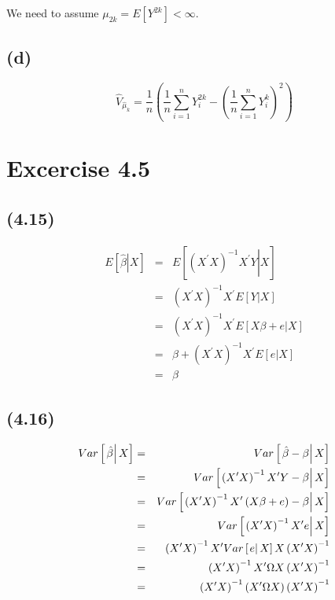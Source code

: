 \documentclass{article}
\begin{document}
We need to assume $\mu _{2k}=E\left[ Y^{2k}\right] <\infty .$

\subsection*{(d)}

\begin{equation*}
\hat{V}_{\hat{\mu}_{k}}=\frac{1}{n}\left( \frac{1}{n}%
\sum_{i=1}^{n}Y_{i}^{2k}-\left( \frac{1}{n}\sum_{i=1}^{n}Y_{i}^{k}\right)
^{2}\right)
\end{equation*}

\section*{Excercise 4.5}

\subsection*{(4.15)}

\begin{eqnarray*}
E\left[ \left. \hat{\beta}\right\vert X\right] &=&E\left[ \left. \left(
X^{\prime }X\right) ^{-1}X^{\prime }Y\right\vert X\right] \\
&=&\left( X^{\prime }X\right) ^{-1}X^{\prime }E\left[ \left. Y\right\vert X%
\right] \\
&=&\left( X^{\prime }X\right) ^{-1}X^{\prime }E\left[ \left. X\beta
+e\right\vert X\right] \\
&=&\beta +\left( X^{\prime }X\right) ^{-1}X^{\prime }E\left[ \left.
e\right\vert X\right] \\
&=&\beta
\end{eqnarray*}

\subsection*{(4.16)}

\begin{eqnarray*}
Var\left[ \left. \hat{\beta}\right\vert X\right] &=&Var\left[ \left. \hat{%
\beta}-\beta \right\vert X\right] \\
&=&Var\left[ \left. \left( X^{\prime }X\right) ^{-1}X^{\prime }Y-\beta
\right\vert X\right] \\
&=&Var\left[ \left. \left( X^{\prime }X\right) ^{-1}X^{\prime }\left( X\beta
+e\right) -\beta \right\vert X\right] \\
&=&Var\left[ \left. \left( X^{\prime }X\right) ^{-1}X^{\prime }e\right\vert X%
\right] \\
&=&\left( X^{\prime }X\right) ^{-1}X^{\prime }Var\left[ \left. e\right\vert X%
\right] X\left( X^{\prime }X\right) ^{-1} \\
&=&\left( X^{\prime }X\right) ^{-1}X^{\prime }\Omega X\left( X^{\prime
}X\right) ^{-1} \\
&=&\left( X^{\prime }X\right) ^{-1}\left( X^{\prime }\Omega X\right) \left(
X^{\prime }X\right) ^{-1}
\end{eqnarray*}
\end{document}
